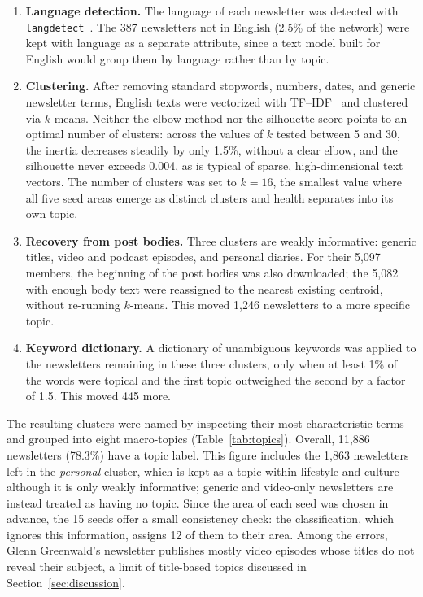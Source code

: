 \documentclass[sigchi]{acmart}
\begin{document}
\begin{enumerate}
\item \textbf{Language detection.} The language of each newsletter was detected with \texttt{langdetect}~\cite{langdetect,nakatani2010langdetect}. The 387 newsletters not in English (2.5\% of the network) were kept with language as a separate attribute, since a text model built for English would group them by language rather than by topic.
\item \textbf{Clustering.} After removing standard stopwords, numbers, dates, and generic newsletter terms, English texts were vectorized with TF--IDF~\cite{salton1988term} and clustered via $k$-means. Neither the elbow method nor the silhouette score points to an optimal number of clusters: across the values of $k$ tested between 5 and 30,
the inertia decreases steadily by only 1.5\%, without a clear elbow,
and the silhouette never exceeds 0.004, as is typical of sparse,
high-dimensional text vectors. The number of clusters was set to $k=16$, the smallest value where all five seed areas emerge as distinct clusters and health separates into its own topic.
\item \textbf{Recovery from post bodies.} Three clusters are weakly informative: generic titles, video and podcast episodes, and personal
  diaries. For their 5{,}097 members, the beginning of the post bodies was also downloaded; the 5{,}082 with enough body text were reassigned to the nearest existing centroid, without re-running $k$-means. This moved 1{,}246 newsletters to a more specific topic.
  \item \textbf{Keyword dictionary.} A dictionary of unambiguous keywords was applied to the newsletters remaining in these three clusters, only when at least 1\% of the words were topical and the first topic outweighed the second by a factor of 1.5. This moved 445 more.
\end{enumerate}

The resulting clusters were named by inspecting their most
characteristic terms and grouped into eight macro-topics
(Table~\ref{tab:topics}). Overall, 11{,}886 newsletters (78.3\%) have a
topic label. This figure includes the 1{,}863 newsletters left in the
\emph{personal} cluster, which is kept as a topic within lifestyle and
culture although it is only weakly informative; generic and video-only
newsletters are instead treated as having no topic. Since the area of
each seed was chosen in advance, the 15 seeds offer a small consistency
check: the classification, which ignores this information, assigns 12
of them to their area. Among the errors, Glenn Greenwald's newsletter publishes mostly video
episodes whose titles do not reveal their subject, a limit of
title-based topics discussed in Section~\ref{sec:discussion}.
\end{document}
